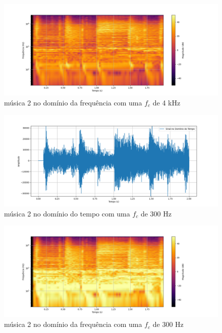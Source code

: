 \begin{anexosenv}
\begin{figure}[h]
	\centering
    \includegraphics[width=\textwidth]{figuras/fig35.png}
	\caption{música 2 no domínio da frequência com uma $f_c$ de 4 kHz}
	\label{fig35}
\end{figure}

\begin{figure}[h]
	\centering
    \includegraphics[width=\textwidth]{figuras/fig36.png}
	\caption{música 2 no domínio do tempo com uma $f_c$ de 300 Hz}
	\label{fig36}
\end{figure}

\begin{figure}[h]
	\centering
    \includegraphics[width=\textwidth]{figuras/fig37.png}
	\caption{música 2 no domínio da frequência com uma $f_c$ de 300 Hz}
	\label{fig37}
\end{figure}


\end{anexosenv}
